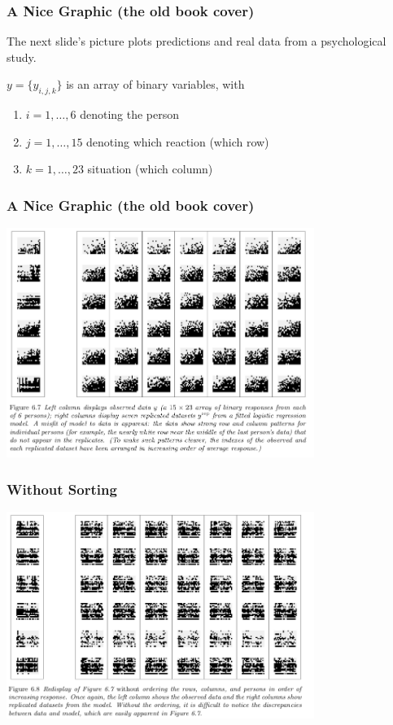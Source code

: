 \documentclass{beamer}
\begin{document}
\begin{frame}
\frametitle{A Nice Graphic (the old book cover)}

The next slide's picture plots predictions and real data from a psychological study.
\newline

$y = \{y_{i,j,k} \}$ is an array of binary variables, with 
\begin{enumerate}
\item $i=1,\ldots,6$ denoting the person
\item $j = 1, \ldots, 15$ denoting which reaction (which row)
\item $k = 1, \ldots, 23$ situation  (which column)
\end{enumerate}

\end{frame}

\begin{frame}
\frametitle{A Nice Graphic (the old book cover)}

\begin{center}
\includegraphics[width=100mm]{data_display.png}
\end{center}


\end{frame}
\begin{frame}
\frametitle{Without Sorting}

\begin{center}
\includegraphics[width=100mm]{unsorted.png}
\end{center}


\end{frame}
\end{document}
